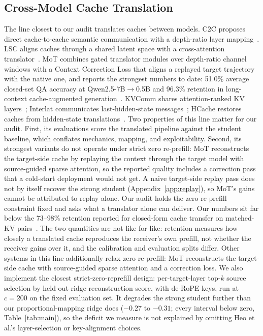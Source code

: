 \documentclass[10pt]{article}
\begin{document}
\subsection{Cross-Model Cache Translation}
The line closest to our audit translates caches between models. C2C proposes
direct cache-to-cache semantic communication with a depth-ratio layer
mapping~\citep{c2c2025}. LSC aligns caches through a shared latent space with
a cross-attention translator~\citep{lsc2026}. MoT combines gated translator
modules over depth-ratio channel windows with a Context Correction Loss that
aligns a replayed target trajectory with the native one, and reports the
strongest numbers to date: 51.0\% average closed-set QA accuracy at
Qwen2.5-7B$\to$0.5B and 96.3\% retention in long-context cache-augmented
generation~\citep{mot2026}. KVComm shares attention-ranked KV
layers~\citep{kvcomm2025}; Interlat communicates last-hidden-state
messages~\citep{interlat2025}; HCache restores caches from hidden-state
translations~\citep{hcache2025}. Two properties of this line matter for our
audit. First, its evaluations score the translated pipeline against the
student baseline, which conflates mechanics, mapping, and exploitability.
Second, its strongest variants do not operate under strict zero re-prefill:
MoT reconstructs the target-side cache by replaying the context through the
target model with source-guided sparse attention, so the reported quality
includes a correction pass that a cold-start deployment would not get. A naive
target-side replay pass does not by itself recover the strong student
(Appendix~\ref{app:replay}), so MoT's gains cannot be attributed to replay
alone. Our audit holds the zero-re-prefill constraint fixed and asks what a
translator alone can deliver. Our numbers sit far below the 73--98\% retention
reported for closed-form cache transfer on matched-KV
pairs~\citep{heo2026}. The two quantities are not like for like: retention
measures how closely a translated cache reproduces the receiver's own prefill,
not whether the receiver gains over it, and the calibration and evaluation
splits differ. Other systems in this line additionally relax zero re-prefill:
MoT reconstructs the target-side cache with source-guided sparse attention and
a correction loss. We also implement the closest strict-zero-reprefill design:
per-target-layer top-$k$ source selection by held-out ridge reconstruction
score, with de-RoPE keys, run at $c{=}200$ on the fixed evaluation set. It
degrades the strong student further than our proportional-mapping ridge does
($-0.27$ to $-0.31$; every interval below zero, Table~\ref{tab:main}), so the
deficit we measure is not explained by omitting Heo et al.'s layer-selection or
key-alignment choices.
\end{document}
